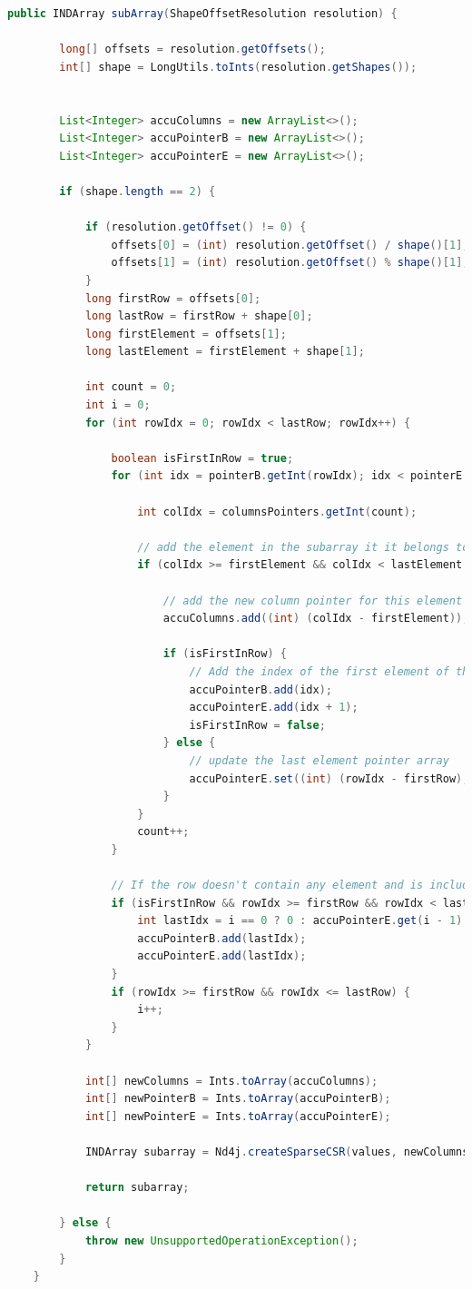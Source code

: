 \begin{lstlisting}[caption=Extract a sub-array of a CSR matrix\label{lst:getcsc},language=Java]
	public INDArray subArray(ShapeOffsetResolution resolution) {
		
		long[] offsets = resolution.getOffsets();
		int[] shape = LongUtils.toInts(resolution.getShapes());
		
		
		List<Integer> accuColumns = new ArrayList<>();
		List<Integer> accuPointerB = new ArrayList<>();
		List<Integer> accuPointerE = new ArrayList<>();
		
		if (shape.length == 2) {
		
			if (resolution.getOffset() != 0) {
				offsets[0] = (int) resolution.getOffset() / shape()[1];
				offsets[1] = (int) resolution.getOffset() % shape()[1];
			}
			long firstRow = offsets[0];
			long lastRow = firstRow + shape[0];
			long firstElement = offsets[1];
			long lastElement = firstElement + shape[1];
			
			int count = 0;
			int i = 0;
			for (int rowIdx = 0; rowIdx < lastRow; rowIdx++) {	
				
				boolean isFirstInRow = true;
				for (int idx = pointerB.getInt(rowIdx); idx < pointerE.getInt(rowIdx); idx++) {
				
					int colIdx = columnsPointers.getInt(count);
					
					// add the element in the subarray it it belongs to the view
					if (colIdx >= firstElement && colIdx < lastElement && rowIdx >= firstRow && rowIdx < lastRow) {
						
						// add the new column pointer for this element
						accuColumns.add((int) (colIdx - firstElement));
						
						if (isFirstInRow) {
							// Add the index of the first element of the row in the pointer array
							accuPointerB.add(idx);
							accuPointerE.add(idx + 1);
							isFirstInRow = false;
						} else {
							// update the last element pointer array
							accuPointerE.set((int) (rowIdx - firstRow), idx + 1);
						}
					}			
					count++;
				}
				
				// If the row doesn't contain any element and is included in the selected rows
				if (isFirstInRow && rowIdx >= firstRow && rowIdx < lastRow) {
					int lastIdx = i == 0 ? 0 : accuPointerE.get(i - 1);
					accuPointerB.add(lastIdx);
					accuPointerE.add(lastIdx);
				}
				if (rowIdx >= firstRow && rowIdx <= lastRow) {
					i++;
				}
			}
			
			int[] newColumns = Ints.toArray(accuColumns);
			int[] newPointerB = Ints.toArray(accuPointerB);
			int[] newPointerE = Ints.toArray(accuPointerE);
			
			INDArray subarray = Nd4j.createSparseCSR(values, newColumns, newPointerB, newPointerE, shape);
			
			return subarray;
		
		} else {
			throw new UnsupportedOperationException();
		}
	}
		\end{lstlisting}
		
